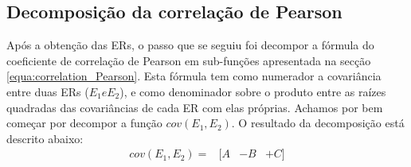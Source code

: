 \subsection{Decomposição da correlação de Pearson}
Após a obtenção das ERs, o passo que se seguiu foi decompor a fórmula do coeficiente de correlação de Pearson em sub-funções apresentada na secção \ref{equa:correlation_Pearson}. Esta fórmula tem como numerador a covariância entre duas ERs ($E_{1} e E_{2}$), e como denominador sobre o produto entre as raízes quadradas das covariâncias de cada ER com elas próprias. Achamos por bem começar por decompor a função $cov(E_{1}, E_{2})$. O resultado da decomposição está descrito abaixo:
\begin{equation}
\begin{aligned}
    cov(E_{1}, E_{2}) = & [ A  & -B & + C ]
\end{aligned}
\end{equation}

